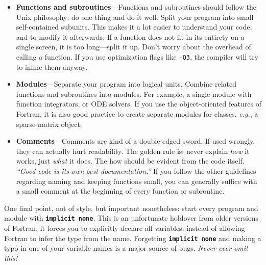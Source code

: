 \documentclass[openany,oneside]{report}
\newcommand{\keyword}[1]{\texttt{\bfseries\color{DarkBlue}#1}}
\begin{document}
\begin{itemize}
  \item\textbf{Functions and subroutines}---Functions and subroutines should follow the Unix philosophy: do one thing and do it well.
    Split your program into small self-contained subunits.
    This makes it a lot easier to understand your code, and to modify it afterwards.
    If a function does not fit in its entirety on a single screen, it is too long---split it up.
    Don't worry about the overhead of calling a function.
    If you use optimization flags like \texttt{-O3}, the compiler will try to inline them anyway.
  \item\textbf{Modules}---Separate your program into logical units.
    Combine related functions and subroutines into modules.
    For example, a single module with function integrators, or ODE solvers.
    If you use the object-oriented features of Fortran, it is also good practice to create separate modules for classes, \emph{e.g.}, a sparse-matrix object.
  \item\textbf{Comments}---Comments are kind of a double-edged sword.
    If used wrongly, they can actually hurt readability.
    The golden rule is: never explain \emph{how} it works, just \emph{what} it does.
    The how should be evident from the code itself.
    \emph{``Good code is its own best documentation.''} If you follow the other guidelines regarding naming and keeping functions small, you can generally suffice with a small comment at the beginning of every function or subroutine.
\end{itemize}
One final point, not of style, but important nonetheless: start every program and module with \keyword{implicit none}.
This is an unfortunate holdover from older versions of Fortran; it forces you to explicitly declare all variables, instead of allowing Fortran to infer the type from the name.
Forgetting \keyword{implicit none} and making a typo in one of your variable names is a major source of bugs.
\emph{Never ever omit this!}

\appendix
\end{document}
